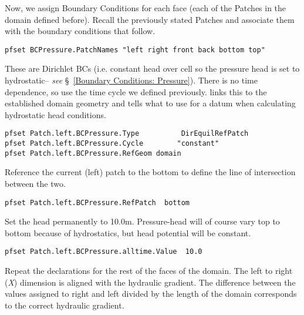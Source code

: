 Now, we assign Boundary Conditions for each face (each of the Patches in the domain defined before).  
Recall the previously stated Patches and associate them with the boundary conditions that follow.

\begin{verbatim}
pfset BCPressure.PatchNames "left right front back bottom top"
\end{verbatim}

These are Dirichlet BCs (i.e. constant head over cell so the pressure head 
is set to hydrostatic-- \emph{see} \S~\ref{Boundary Conditions: Pressure}).  
There is no time dependence, so use the  time cycle we defined previously.  
 links this to the established domain geometry and tells \parflow{} 
what to use for a datum when calculating hydrostatic head conditions.

\begin{verbatim}
pfset Patch.left.BCPressure.Type          DirEquilRefPatch
pfset Patch.left.BCPressure.Cycle        "constant"
pfset Patch.left.BCPressure.RefGeom domain
\end{verbatim}

Reference the current (left) patch to the bottom to define the line of intersection between the two.

\begin{verbatim}
pfset Patch.left.BCPressure.RefPatch  bottom
\end{verbatim}

Set the head permanently to 10.0m.  Pressure-head will of course vary top to bottom because of hydrostatics, 
but head potential will be constant.

\begin{verbatim}
pfset Patch.left.BCPressure.alltime.Value  10.0
\end{verbatim}

Repeat the declarations for the rest of the faces of the domain.  The left to right (\emph{X}) 
dimension is aligned with the hydraulic gradient.  The difference between the values assigned to 
right and left divided by the length of the domain corresponds to the correct hydraulic gradient.

